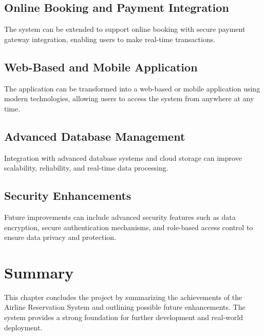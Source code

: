 \subsection{Online Booking and Payment Integration}

The system can be extended to support online booking with secure payment gateway integration, enabling users to make real-time transactions.

\subsection{Web-Based and Mobile Application}

The application can be transformed into a web-based or mobile application using modern technologies, allowing users to access the system from anywhere at any time.

\subsection{Advanced Database Management}

Integration with advanced database systems and cloud storage can improve scalability, reliability, and real-time data processing.

\subsection{Security Enhancements}

Future improvements can include advanced security features such as data encryption, secure authentication mechanisms, and role-based access control to ensure data privacy and protection.

\section{Summary}

This chapter concludes the project by summarizing the achievements of the Airline Reservation System and outlining possible future enhancements. The system provides a strong foundation for further development and real-world deployment.